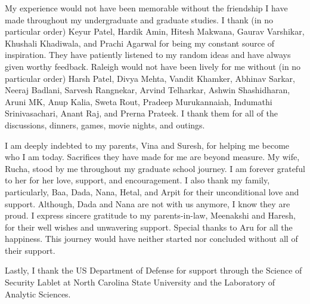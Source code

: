 \begin{acknowledgements}
My experience would not have been memorable without the friendship I have made throughout my undergraduate and graduate studies. 
I thank (in no particular order) Keyur Patel, Hardik Amin, Hitesh Makwana, Gaurav Varshikar, Khushali Khadiwala, and Prachi Agarwal for being my constant source of inspiration. 
They have patiently listened to my random ideas and have always given worthy feedback. 
Raleigh would not have been lively for me without (in no particular order) Harsh Patel, Divya Mehta, Vandit Khamker, Abhinav Sarkar, Neeraj Badlani, Sarvesh Rangnekar, Arvind Telharkar, Ashwin Shashidharan, Aruni MK, Anup Kalia, Sweta Rout, Pradeep Murukannaiah, Indumathi Srinivasachari, Anant Raj, and Prerna Prateek.
I thank them for all of the discussions, dinners, games, movie nights, and outings. 

I am deeply indebted to my parents, Vina and Suresh, for helping me become who I am today. 
Sacrifices they have made for me are beyond measure. 
My wife, Rucha, stood by me throughout my graduate school journey. 
I am forever grateful to her for her love, support, and encouragement. 
I also thank my family, particularly, Baa, Dada, Nana, Hetal, and Arpit for their unconditional love and support. 
Although, Dada and Nana are not with us anymore, I know they are proud. 
I express sincere gratitude to my parents-in-law, Meenakshi and Haresh, for their well wishes and unwavering support. 
Special thanks to Aru for all the happiness. 
This journey would have neither started nor concluded without all of their support. 

Lastly, I thank the US Department of Defense for support through the
Science of Security Lablet at North Carolina State University and the Laboratory of Analytic Sciences.

\end{acknowledgements}

\thesistableofcontents

\thesislistoftables

\thesislistoffigures
